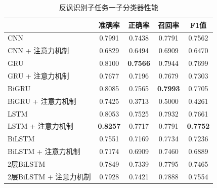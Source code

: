 \begin{table}[htb]
  \centering
  \begin{minipage}[t]{0.8\linewidth}
  \caption{反讽识别子任务一子分类器性能}
  \label{tab:exp_irony_det_Bb01_result}
    \begin{tabularx}{\linewidth}{X|cccc}
    \toprule[1.5pt]
    & 准确率 & 正确率 & 召回率 & F1值 \\
    \hline
    CNN & 0.7991 & 0.7438 & 0.7791 & 0.7562 \\ %
    CNN + 注意力机制 & 0.6829 & 0.6494 & 0.6909 & 0.6470 \\ %
    \hline
    GRU & 0.8100 & \bf 0.7566 & 0.7944 & 0.7699 \\ %
    GRU + 注意力机制 & 0.7677 & 0.7196 & 0.7679 & 0.7303 \\ %
    \hline
    BiGRU & 0.8085 & 0.7565 & \bf 0.7993 & 0.7705 \\ %
    BiGRU + 注意力机制 & 0.7425 & 0.3713 & 0.5000 &  0.4261 \\ %
    \hline
    LSTM & 0.8053 & 0.7525 & 0.7932 & 0.7661 \\ %
    LSTM + 注意力机制 & \bf 0.8257 & 0.7717 & 0.7791 & \bf 0.7752 \\ %
    \hline
    BiLSTM & 0.7551 & 0.7169 & 0.7734 & 0.7236 \\ %
    BiLSTM + 注意力机制 & 0.7174 & 0.6909 & 0.7460 & 0.6889 \\ %
    \hline
    2层BiLSTM & 0.7849 & 0.7339 & 0.7795 & 0.7465 \\ %
    2层BiLSTM + 注意力机制 & 0.7928 & 0.7421 & 0.7888 & 0.7554 \\ %
    \bottomrule[1.5pt]
    \end{tabularx}
  \end{minipage}
\end{table}

